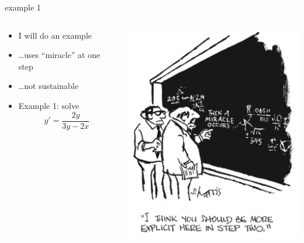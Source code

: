 \documentclass{beamer}
\begin{document}
\begin{frame}{example 1}

\begin{columns}
\begin{column}{0.6\textwidth}
\begin{itemize}
\item I will do an example
\item \dots uses ``miracle'' at one step
\item \dots not sustainable
\item Example 1: solve
    $$y' = \frac{2y}{3y-2x}$$

\vspace{30mm}
\end{itemize}
\end{column}
\begin{column}{0.4\textwidth}
\includegraphics[width=\textwidth]{figs/miracle}

\vspace{20mm}
\end{column}
\end{columns}
\end{frame}
\end{document}
